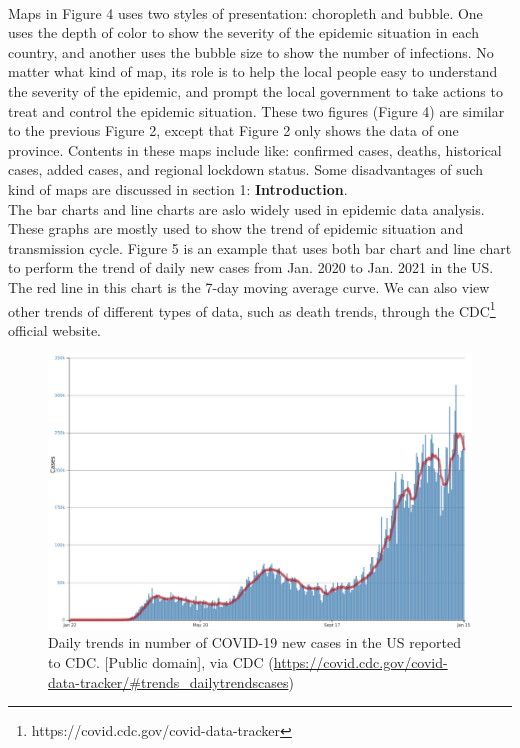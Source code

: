 \documentclass[sigplan,screen]{acmart}
\begin{document}
\\
Maps in Figure 4 uses two styles of presentation: choropleth and bubble.
One uses the depth of color to show the severity of the epidemic situation in each country, and another uses the bubble size to show the number of infections.
No matter what kind of map, its role is to help the local people easy to understand the severity of the epidemic, and prompt the local government to take actions to treat and control the epidemic situation.
These two figures (Figure 4) are similar to the previous Figure 2, except that Figure 2 only shows the data of one province.
Contents in these maps include like: confirmed cases, deaths, historical cases, added cases, and regional lockdown status.
Some disadvantages of such kind of maps are discussed in section 1: \textbf{Introduction}.
\\
The bar charts and line charts are aslo widely used in epidemic data analysis.
These graphs are mostly used to show the trend of epidemic situation and transmission cycle.
Figure 5 is an example that uses both bar chart and line chart to perform the trend of daily new cases from Jan. 2020 to Jan. 2021 in the US. The red line in this chart is the 7-day moving average curve.
We can also view other trends of different types of data, such as death trends, through the CDC\footnote{https://covid.cdc.gov/covid-data-tracker} official website.
\begin{figure}[htb]
	\centering\includegraphics[width=\linewidth]{linebar-us-1-15.png}
	\caption{Daily trends in number of COVID-19 new cases in the US reported to CDC. [Public domain], via CDC (\url{https://covid.cdc.gov/covid-data-tracker/\#trends_dailytrendscases})}
\end{figure}
\end{document}
